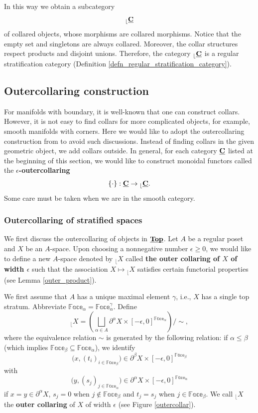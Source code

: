 \documentclass[reqno, 10pt]{amsart}
\numberwithin{equation}{section}
\numberwithin{equation}{section}
\theoremstyle{definition}
\theoremstyle{remark}
\newcommand{\beqn}{\begin{equation*}}
\newcommand{\eeqn}{\end{equation*}}
\newcommand{\mb}{\mathbb}
\renewcommand{\outer}{{}_{\lfloor}}
\newcommand{\uds}[1]{\underline{\smash{#1}}}
\begin{document}
In this way we obtain a subcategory 
\beqn
\outer \uds{\bf C}
\eeqn
of collared objects, whose morphisms are collared morphisms. Notice that the empty set and singletons are always collared. Moreover, the collar structures respect products and disjoint unions. Therefore, the category $\outer \uds{\bf C}$ is a regular stratification category (Definition \ref{defn_regular_stratification_category}). 



\subsection{Outercollaring construction}\label{sub:outercollaring}

For manifolds with boundary, it is well-known that one can construct collars. However, it is not easy to find collars for more complicated objects, for example, smooth manifolds with corners. Here we would like to adopt the outercollaring construction from \cite[Section 17]{FOOO_Kuranishi} to avoid such discussions. Instead of finding collars in the given geometric object, we add collars outside. In general, for each category $\uds{\bf C}$ listed at the beginning of this section, we would like to construct monoidal functors called the {\bf $\epsilon$-outercollaring}
\beqn
\{\cdot\}: \uds{\bf C} \to \outer \uds{\bf C}.
\eeqn
Some care must be taken when we are in the smooth category.


\subsubsection{Outercollaring of stratified spaces}

We first discuss the outercollaring of objects in $\uds{\bf Top}$. Let $A$ be a regular poset and $X$ be an $A$-space. Upon choosing a nonnegative number $\epsilon \geq 0$, we would like to define a new $A$-space denoted by $\outer X$ called {\bf the outer collaring of $X$ of width $\epsilon$} such that the association $X \mapsto \outer X$ satisfies certain functorial properties (see Lemma \ref{outer_product}). 

We first assume that $A$ has a unique maximal element $\gamma$, i.e., $X$ has a single top stratum. Abbreviate $\mb{Face}_\alpha = \mb{Face}_\alpha^\gamma$. Define
\beqn
\outer X = \left( \bigsqcup_{\alpha \in A} \partial^\alpha X \times [-\epsilon, 0]^{\mb{Face}_\alpha} \right)/ \sim,
\eeqn
where  the equivalence relation $\sim$ is generated by the following relation: if $\alpha \leq \beta$ (which implies $\mb{Face}_\beta \subseteq \mb{Face}_\alpha$), we identify 
\beqn
\big( x, (t_i)_{i \in \mb{Face}_\beta} \big) \in \partial^\beta X \times [-\epsilon, 0]^{\mb{Face}_\beta}
\eeqn
with
\beqn
\big( y, (s_j)_{j\in \mb{Face}_\alpha} \big) \in \partial^\alpha X \times [-\epsilon, 0]^{\mb{Face}_\alpha}
\eeqn
if $x = y \in \partial^\alpha X$, $s_j = 0$ when $j \notin \mb{Face}_\beta$ and $t_j = s_j$ when $j \in \mb{Face}_\beta$. We call $\outer X$ the {\bf outer collaring} of $X$ of width $\epsilon$ (see Figure \ref{outercollar}).
\end{document}
